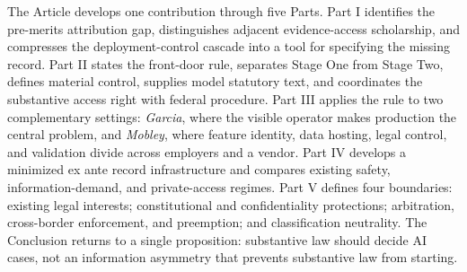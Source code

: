 The Article develops one contribution through five Parts. Part I identifies the pre-merits attribution gap, distinguishes adjacent evidence-access scholarship, and compresses the deployment-control cascade into a tool for specifying the missing record. Part II states the front-door rule, separates Stage One from Stage Two, defines material control, supplies model statutory text, and coordinates the substantive access right with federal procedure. Part III applies the rule to two complementary settings: \emph{Garcia}, where the visible operator makes production the central problem, and \emph{Mobley}, where feature identity, data hosting, legal control, and validation divide across employers and a vendor. Part IV develops a minimized ex ante record infrastructure and compares existing safety, information-demand, and private-access regimes. Part V defines four boundaries: existing legal interests; constitutional and confidentiality protections; arbitration, cross-border enforcement, and preemption; and classification neutrality. The Conclusion returns to a single proposition: substantive law should decide AI cases, not an information asymmetry that prevents substantive law from starting.
